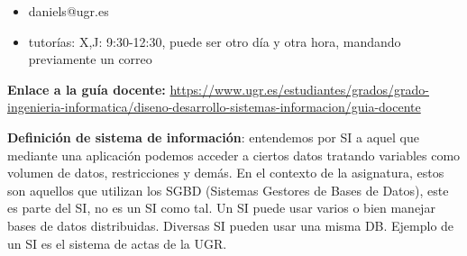 \documentclass[12pt]{report} %
\providecommand{\tightlist}{%
  \setlength{\itemsep}{0pt}\setlength{\parskip}{0pt}}
\begin{document}
\begin{itemize}
\tightlist
\item
  daniels@ugr.es\\
\item
  tutorías: X,J: 9:30-12:30, puede ser otro día y otra hora, mandando
  previamente un correo
\end{itemize}

\begin{center}
\textbf{Enlace a la guía docente:} \href{https://www.ugr.es/estudiantes/grados/grado-ingenieria-informatica/diseno-desarrollo-sistemas-informacion/guia-docente}{https://www.ugr.es/estudiantes/grados/grado-ingenieria-informatica/diseno-desarrollo-sistemas-informacion/guia-docente}
\end{center}

\textbf{Definición de sistema de información}: entendemos por SI a aquel
que mediante una aplicación podemos acceder a ciertos datos tratando
variables como volumen de datos, restricciones y demás. En el contexto
de la asignatura, estos son aquellos que utilizan los SGBD (Sistemas
Gestores de Bases de Datos), este es parte del SI, no es un SI como tal.
Un SI puede usar varios o bien manejar bases de datos distribuidas.
Diversas SI pueden usar una misma DB. Ejemplo de un SI es el sistema de
actas de la UGR.


\end{document}
